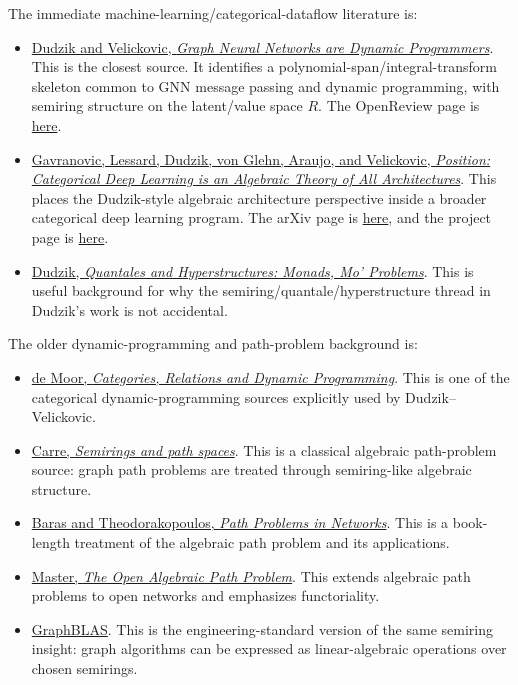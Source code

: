 \documentclass[11pt]{article}
\begin{document}
The immediate machine-learning/categorical-dataflow literature is:

\begin{itemize}[leftmargin=2em]
\item \href{https://arxiv.org/abs/2203.15544}{Dudzik and Velickovic,
\textit{Graph Neural Networks are Dynamic Programmers}}. This is the closest
source. It identifies a polynomial-span/integral-transform skeleton common to
GNN message passing and dynamic programming, with semiring structure on the
latent/value space \(R\). The OpenReview page is
\href{https://openreview.net/forum?id=wu1Za9dY1GY}{here}.
\item \href{https://proceedings.mlr.press/v235/gavranovic24a.html}
{Gavranovic, Lessard, Dudzik, von Glehn, Araujo, and Velickovic,
\textit{Position: Categorical Deep Learning is an Algebraic Theory of All
Architectures}}. This places the Dudzik-style algebraic architecture
perspective inside a broader categorical deep learning program. The arXiv page
is \href{https://arxiv.org/abs/2402.15332}{here}, and the project page is
\href{https://categoricaldeeplearning.com/}{here}.
\item \href{https://arxiv.org/abs/1707.09227}{Dudzik,
\textit{Quantales and Hyperstructures: Monads, Mo' Problems}}. This is useful
background for why the semiring/quantale/hyperstructure thread in Dudzik's work
is not accidental.
\end{itemize}

The older dynamic-programming and path-problem background is:

\begin{itemize}[leftmargin=2em]
\item \href{https://www.cambridge.org/core/journals/mathematical-structures-in-computer-science/article/categories-relations-and-dynamic-programming/552525CAD62B986E5C7461DB55B3B952}
{de Moor, \textit{Categories, Relations and Dynamic Programming}}. This is one
of the categorical dynamic-programming sources explicitly used by
Dudzik--Velickovic.
\item \href{https://www.sciencedirect.com/science/article/pii/0012365X7990061X}
{Carre, \textit{Semirings and path spaces}}. This is a classical algebraic
path-problem source: graph path problems are treated through semiring-like
algebraic structure.
\item \href{https://link.springer.com/book/10.1007/978-3-031-79983-9}
{Baras and Theodorakopoulos, \textit{Path Problems in Networks}}. This is a
book-length treatment of the algebraic path problem and its applications.
\item \href{https://arxiv.org/abs/2005.06682}{Master, \textit{The Open
Algebraic Path Problem}}. This extends algebraic path problems to open networks
and emphasizes functoriality.
\item \href{https://graphblas.org/}{GraphBLAS}. This is the
engineering-standard version of the same semiring insight: graph algorithms can
be expressed as linear-algebraic operations over chosen semirings.
\end{itemize}
\end{document}
